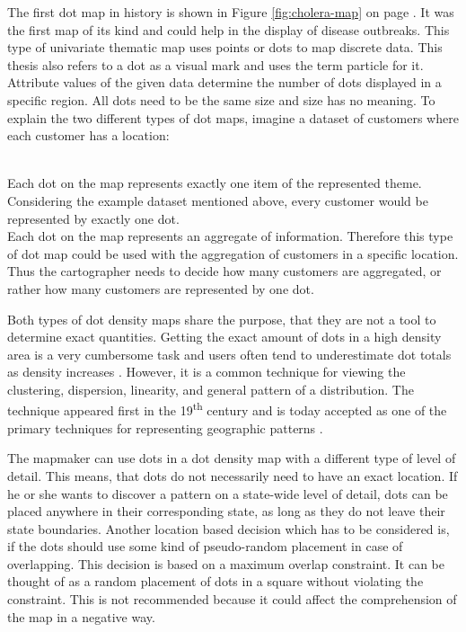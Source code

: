 The first dot map in history is shown in Figure \ref{fig:cholera-map} on page \pageref{fig:cholera-map}. It was the first map of its kind and could help in the display of disease outbreaks. This type of univariate thematic map uses points or dots to map discrete data. This thesis also refers to a dot as a visual mark and uses the term particle for it. Attribute values of the given data determine the number of dots displayed in a specific region. All dots need to be the same size and size has no meaning. To explain the two different types of dot maps, imagine a dataset of customers where each customer has a location:

\begin{enumerate}
 \hfill \\
Each dot on the map represents exactly one item of the represented theme. Considering the example dataset mentioned above, every customer would be represented by exactly one dot.
 \hfill \\
Each dot on the map represents an aggregate of information. Therefore this type of dot map could be used with the aggregation of customers in a specific location. Thus the cartographer needs to decide how many customers are aggregated, or rather how many customers are represented by one dot.
\end{enumerate}

Both types of dot density maps share the purpose, that they are not a tool to determine exact quantities. Getting the exact amount of dots in a high density area is a very cumbersome task and users often tend to underestimate dot totals as density increases . However, it is a common technique for viewing the clustering, dispersion, linearity, and general pattern of a distribution. The technique appeared first in the 19\textsuperscript{th} century and is today accepted as one of the primary techniques for representing geographic patterns .

The mapmaker can use dots in a dot density map with a different type of level of detail. This means, that dots do not necessarily need to have an exact location. If he or she wants to discover a pattern on a state-wide level of detail, dots can be placed anywhere in their corresponding state, as long as they do not leave their state boundaries.
Another location based decision which has to be considered is, if the dots should use some kind of pseudo-random placement in case of overlapping. This decision is based on a maximum overlap constraint. It can be thought of as a random placement of dots in a square without violating the constraint. This is not recommended because it could affect the comprehension of the map in a negative way.

